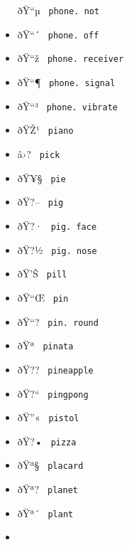 \begin{itemize}
  \label{symbol-phone.not}{{ ðŸ``µ }
  \texttt{\ phone.\ not\ }}
\item
  \label{symbol-phone.off}{{ ðŸ``´ }
  \texttt{\ phone.\ off\ }}
\item
  \label{symbol-phone.receiver}{{ ðŸ``ž }
  \texttt{\ phone.\ receiver\ }}
\item
  \label{symbol-phone.signal}{{ ðŸ``¶ }
  \texttt{\ phone.\ signal\ }}
\item
  \label{symbol-phone.vibrate}{{ ðŸ``³ }
  \texttt{\ phone.\ vibrate\ }}
\item
  \label{symbol-piano}{{ ðŸŽ¹ } \texttt{\ piano\ }}
\item
  \label{symbol-pick}{{ â›? } \texttt{\ pick\ }}
\item
  \label{symbol-pie}{{ ðŸ¥§ } \texttt{\ pie\ }}
\item
  \label{symbol-pig}{{ ðŸ?-- } \texttt{\ pig\ }}
\item
  \label{symbol-pig.face}{{ ðŸ?· }
  \texttt{\ pig.\ face\ }}
\item
  \label{symbol-pig.nose}{{ ðŸ?½ }
  \texttt{\ pig.\ nose\ }}
\item
  \label{symbol-pill}{{ ðŸ'Š } \texttt{\ pill\ }}
\item
  \label{symbol-pin}{{ ðŸ``Œ } \texttt{\ pin\ }}
\item
  \label{symbol-pin.round}{{ ðŸ``? }
  \texttt{\ pin.\ round\ }}
\item
  \label{symbol-pinata}{{ ðŸª } \texttt{\ pinata\ }}
\item
  \label{symbol-pineapple}{{ ðŸ?? }
  \texttt{\ pineapple\ }}
\item
  \label{symbol-pingpong}{{ ðŸ?{}`` }
  \texttt{\ pingpong\ }}
\item
  \label{symbol-pistol}{{ ðŸ''« } \texttt{\ pistol\ }}
\item
  \label{symbol-pizza}{{ ðŸ?• } \texttt{\ pizza\ }}
\item
  \label{symbol-placard}{{ ðŸª§ } \texttt{\ placard\ }}
\item
  \label{symbol-planet}{{ ðŸª? } \texttt{\ planet\ }}
\item
  \label{symbol-plant}{{ ðŸª´ } \texttt{\ plant\ }}
\item

\end{itemize}
